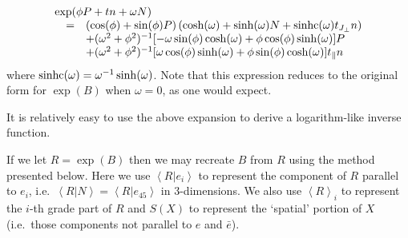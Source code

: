 \[
\begin{array}{rl}
\multicolumn{2}{l}{\exp(\phi P + tn + \omega N)}\\
\quad = & \left(\cos(\phi) + \sin(\phi)P\right)\left(\cosh(\omega) +
		\sinh(\omega)N + \sinhc(\omega)t_\Jperp n\right)\\
&+ (\omega^2 + \phi^2)^{-1} [-\omega\sin(\phi)\cosh(\omega)+\phi\cos(\phi)\sinh(\omega)]P\\
&+ (\omega^2 + \phi^2)^{-1} [\omega\cos (\phi)\sinh (\omega) + \phi \sin(\phi)\cosh(\omega)] t_\parallel n \\
	\end{array}
\]
where $\mathrm{sinhc}(\omega) = \omega^{-1}\sinh(\omega)$. Note that this expression reduces to 
the original form for $\exp(B)$ when $\omega = 0$, as one would expect.

It is relatively easy to use the above expansion to derive a logarithm-like inverse 
function. 

If we let $R = \exp(B)$ then we may recreate $B$ from $R$ using the method 
presented
below. Here we use $\left<R|e_i\right>$ to represent the component of $R$
parallel to $e_i$, i.e.\ $\left<R|N\right> = \left<R|e_{45}\right>$ in 
3-dimensions. We also use $\left<R\right>_i$ to represent the 
$i$-th grade part of $R$ and $S(X)$ to represent the 
`spatial' portion of $X$ (i.e.\ those components not parallel to $e$ and 
$\bar{e}$).

